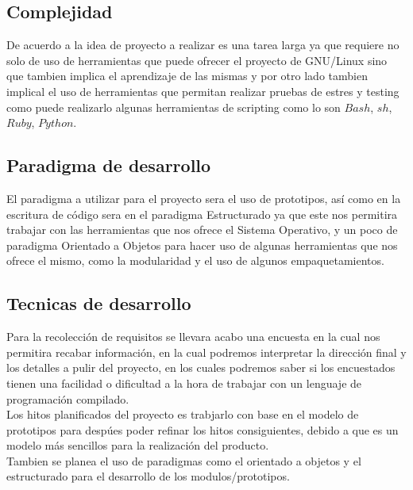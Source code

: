 \documentclass[10pt,executivepaper]{article}
\begin{document}
\subsection{Complejidad}
De acuerdo a la idea de proyecto a realizar es una tarea larga ya que requiere no solo de uso de herramientas que puede ofrecer el proyecto de GNU/Linux sino que tambien implica el aprendizaje de las mismas y por otro lado tambien implical el uso de herramientas que permitan realizar pruebas de estres y testing como puede realizarlo algunas herramientas de scripting como lo son $Bash$, $sh$, $Ruby$, $Python$.
\subsection{Paradigma de desarrollo}
El paradigma a utilizar para el proyecto sera el uso de prototipos, así como en la escritura de código sera en el paradigma Estructurado ya que este nos permitira trabajar con las herramientas que nos ofrece el Sistema Operativo, y un poco de paradigma Orientado a Objetos para hacer uso de algunas herramientas que nos ofrece el mismo, como la modularidad y el uso de algunos empaquetamientos.
\subsection{Tecnicas de desarrollo}
Para la recolección de requisitos se llevara acabo una encuesta en la cual nos permitira recabar información, en la cual podremos interpretar la dirección final y los detalles a pulir del proyecto, en los cuales podremos saber si los encuestados tienen una facilidad o dificultad a la hora de trabajar con un lenguaje de programación compilado.\\
Los hitos planificados del proyecto es trabjarlo con base en el modelo de prototipos para despúes poder refinar los hitos consiguientes, debido a que es un modelo más sencillos para la realización del producto.\\
Tambien se planea el uso de paradigmas como el orientado a objetos y el estructurado para el desarrollo de los modulos/prototipos.
\printindex
\end{document}
